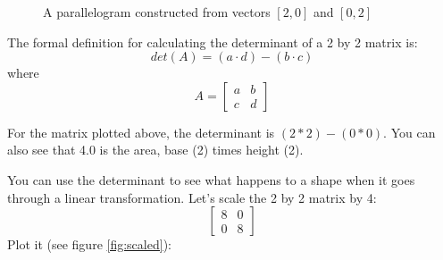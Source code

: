 \begin{figure}[htbp]
    \centering
    \caption{A parallelogram constructed from vectors $\left[2, 0 \right]$ and 
    $\left[0, 2 \right]$}
    \label{fig:twos}
\end{figure}
 
The formal definition for calculating the determinant of a 2 by 2 matrix is:
$$det(A) = (a\cdot d)-(b\cdot c)$$
where
$$A = 
\begin{bmatrix}
a & b  \\
c & d 
\end{bmatrix}
$$

For the matrix plotted above, the determinant is $(2*2)-(0*0)$. You can also 
see that 4.0 is the area, base (2) times height (2).

You can use the determinant to see what happens to a shape when it goes 
through a linear transformation. Let's scale the 2 by 2 matrix by 4:
$$
\begin{bmatrix}
8 & 0  \\
0 & 8 
\end{bmatrix}
$$
Plot it (see figure \ref{fig:scaled}):

